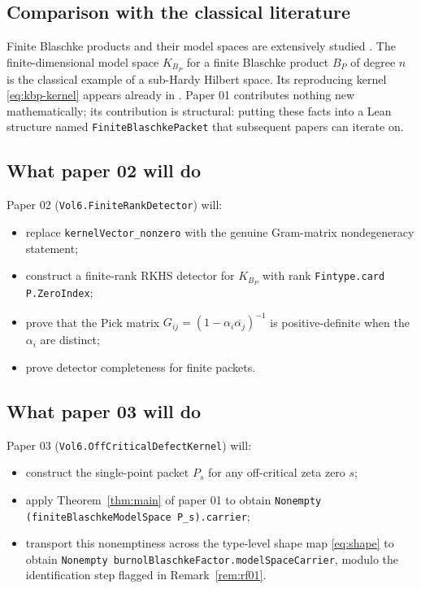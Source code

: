 \documentclass[11pt]{article}
\theoremstyle{plain}
\theoremstyle{definition}
\theoremstyle{remark}
\newcommand{\KBp}{K_{B_{P}}}
\newcommand{\conj}[1]{\overline{#1}}
\newcommand{\code}[1]{\texttt{#1}}
\begin{document}
\subsection{Comparison with the classical literature}

Finite Blaschke products and their model spaces are extensively studied
\cite{garcia-mashreghi-ross,sarason-sub-hardy,nikolski-treatise}.  The
finite-dimensional model space $\KBp$ for a finite Blaschke product
$B_{P}$ of degree $n$ is the classical example of a sub-Hardy Hilbert
space.  Its reproducing kernel \eqref{eq:kbp-kernel} appears already in
\cite{ahern-clark}.  Paper 01 contributes nothing new mathematically; its
contribution is structural: putting these facts into a Lean structure
named \code{FiniteBlaschkePacket} that subsequent papers can iterate on.

\subsection{What paper 02 will do}

Paper 02 (\code{Vol6.FiniteRankDetector}) will:
\begin{itemize}
  \item replace \code{kernelVector\_nonzero} with the genuine Gram-matrix
        nondegeneracy statement;
  \item construct a finite-rank RKHS detector for $\KBp$ with rank
        \code{Fintype.card P.ZeroIndex};
  \item prove that the Pick matrix
        $G_{ij} = (1-\alpha_{i}\conj{\alpha_{j}})^{-1}$ is positive-definite
        when the $\alpha_{i}$ are distinct;
  \item prove detector completeness for finite packets.
\end{itemize}

\subsection{What paper 03 will do}

Paper 03 (\code{Vol6.OffCriticalDefectKernel}) will:
\begin{itemize}
  \item construct the single-point packet $P_{s}$ for any off-critical
        zeta zero $s$;
  \item apply Theorem~\ref{thm:main} of paper 01 to obtain
        \code{Nonempty (finiteBlaschkeModelSpace P\_s).carrier};
  \item transport this nonemptiness across the type-level shape map
        \eqref{eq:shape} to obtain
        \code{Nonempty burnolBlaschkeFactor.modelSpaceCarrier}, modulo the
        identification step flagged in Remark~\ref{rem:rf01}.
\end{itemize}
\end{document}
